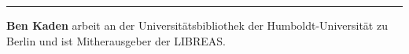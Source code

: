 \begin{center}\rule{0.5\linewidth}{\linethickness}\end{center}

\textbf{Ben Kaden} arbeit an der Universitätsbibliothek der
Humboldt-Universität zu Berlin und ist Mitherausgeber der LIBREAS.
